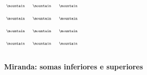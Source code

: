 \documentclass[oneside,12pt]{article}
\begin{document}
%
\pu

\unitlength=8pt

\vspace*{-0.25cm}
\hspace*{-0.5cm}
$\scalebox{0.55}{$
 \begin{array}{ccccc}
 \mountain && \mountain && \mountain \\[20pt]
 \mountain && \mountain && \mountain \\[20pt]
 \mountain && \mountain && \mountain \\[20pt]
 \mountain && \mountain && \mountain \\[20pt]
 \end{array}
 $}
$

\newpage

%

{\bf Miranda: somas inferiores e superiores}
\end{document}
